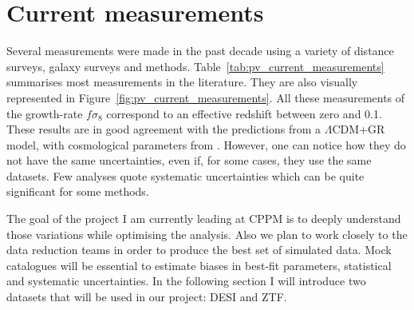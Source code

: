 \section{Current measurements}
\label{velocities:current}

Several measurements were made in the past decade using a variety of distance surveys, 
galaxy surveys and methods. 
Table~\ref{tab:pv_current_measurements} summarises most measurements in the literature.
They are also visually represented in Figure~\ref{fig:pv_current_measurements}. 
All these measurements of the growth-rate $f\sigma_8$ correspond to an effective redshift between zero and 0.1. 
These results are in good agreement with the predictions from a $\Lambda$CDM+GR model, with 
cosmological parameters from \cite{planckcollaborationPlanck2018Results2020}. 
However, one can notice how they do not have the same uncertainties, even if, for some cases, they 
use the same datasets. Few analyses quote systematic uncertainties which can be quite significant for  
some methods. 

The goal of the project I am currently leading at CPPM is to deeply understand those variations 
while optimising the analysis. Also we plan to work closely to the data reduction teams 
in order to produce the best set of simulated data. 
Mock catalogues will be essential to estimate biases 
in best-fit parameters, statistical and systematic uncertainties. 
In the following section I will introduce two datasets that will be used in our project: DESI and ZTF. 

